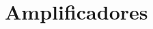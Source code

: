 \documentclass[../candidatura.tex]{subfiles}
\begin{document}
\esborrador

\section{Amplificadores}

\newpage
\end{document}

